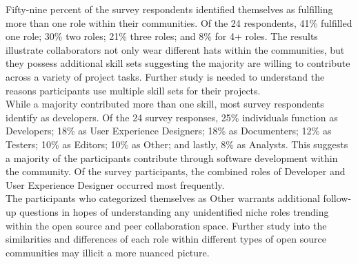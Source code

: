 Fifty-nine percent of the survey respondents identified themselves as fulfilling more than one 
role within their communities. Of the 24 respondents, 41\% fulfilled one role; 30\% two roles; 21\% three roles; and 8\% for 4+ roles. 
The results illustrate collaborators not only wear different hats within the communities, but they possess additional skill sets suggesting the majority 
are willing to contribute across a variety of project tasks. Further study is needed to understand the reasons participants use multiple skill sets for their projects.\\

\noindent While a majority contributed more than one skill, most survey respondents identify as developers. Of the 24 survey responses, 25\% individuals function as Developers; 
18\% as User Experience Designers; 18\% as Documenters; 12\% as Testers; 10\% as Editors; 10\% as Other; and lastly, 8\% as Analysts. This suggests a majority of the participants contribute through software development 
within the community. Of the survey participants, the combined roles of Developer and User Experience Designer occurred most frequently. \\
 
\noindent The participants who categorized themselves as Other warrants additional follow-up questions in hopes of understanding any unidentified niche roles 
trending within the open source and peer collaboration space. Further study into the similarities and differences of each role within different types of open source 
communities may illicit a more nuanced picture.


